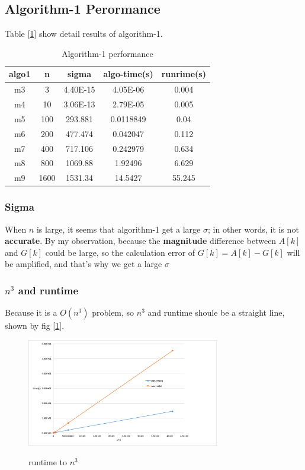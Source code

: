 \documentclass{article}
\begin{document}
\subsection{Algorithm-1 Perormance}
Table [\ref{tab:algo1}] show detail results of algorithm-1.
\begin{table}[h!]
    \centering
    \caption{Algorithm-1 performance}
    \begin{tabular}{|c|c|c|c|c|}
        \hline
        \textbf{algo1} & n   & sigma & algo-time(s) & runrime(s) \bigstrut\\
        \hline
        m3  & 3   & 4.40E-15 & 4.05E-06 & 0.004 \bigstrut\\
        \hline
        m4  & 10  & 3.06E-13 & 2.79E-05 & 0.005 \bigstrut\\
        \hline
        m5  & 100 & 293.881 & 0.0118849 & 0.04 \bigstrut\\
        \hline
        m6  & 200 & 477.474 & 0.042047 & 0.112 \bigstrut\\
        \hline
        m7  & 400 & 717.106 & 0.242979 & 0.634 \bigstrut\\
        \hline
        m8  & 800 & 1069.88 & 1.92496 & 6.629 \bigstrut\\
        \hline
        m9  & 1600 & 1531.34 & 14.5427 & 55.245 \bigstrut\\
        \hline
    \end{tabular}%

    \label{tab:algo1}
\end{table}%
\subsubsection{Sigma}
\label{sec:algo1-sigma}
When $n$ is large, it seems that algorithm-1 get a large $\sigma$; in other words, it is not \textbf{accurate}. By my observation,
because the \textbf{magnitude} difference between $A[k]$ and $G[k]$ could be large, so the calculation error of $G[k] = A[k] - G[k]$
will be amplified, and that's why we get a large \boldmath$\sigma$
\newpage
\subsubsection{$n^3$ and runtime}
Because it is a $O(n^3)$ problem, so $n^3$ and runtime shoule be a straight line, shown by fig [\ref{fig:algo1-runtime}].
\begin{figure}[H]
    \centering
    \caption{runtime to $n^3$}
    \includegraphics[width=0.75\textwidth]{src/algo1-runtime.png}
    \label{fig:algo1-runtime}
\end{figure}
\end{document}
